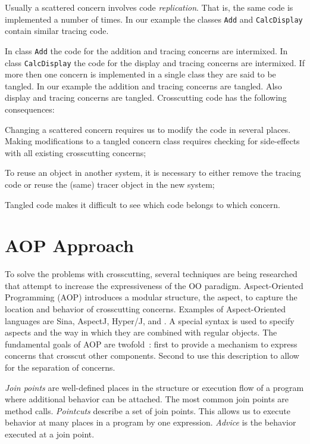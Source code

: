 Usually a scattered concern involves code \emph{replication}.
That is, the same code is implemented a number of times.
In our example the classes \lstinline|Add| and \lstinline|CalcDisplay| contain similar tracing code.

In class \lstinline|Add| the code for the addition and tracing concerns are intermixed.
In class \lstinline|CalcDisplay| the code for the display and tracing concerns are intermixed.
If more then one concern is implemented in a single class they are said to be tangled.
In our example the addition and tracing concerns are tangled.
Also display and tracing concerns are tangled.
Crosscutting code has the following consequences:
\begin{description}[style=nextline,noitemsep]
  \item[Code is difficult to change] Changing a scattered concern requires us to modify the code in several places.
Making modifications to a tangled concern class requires checking for side-effects with all existing crosscutting concerns;
  \item[Code is harder to reuse] To reuse an object in another system, it is necessary to either remove the tracing code or reuse the (same) tracer object in the new system;
  \item[Code is harder to understand] Tangled code makes it difficult to see which code belongs to which concern.
\end{description}

\section{AOP Approach}

To solve the problems with crosscutting, several techniques are being researched that attempt to increase the expressiveness of the OO paradigm.
Aspect-Oriented Programming (AOP) introduces a modular structure, the aspect, to capture the location and behavior of crosscutting concerns.
Examples of Aspect-Oriented languages are Sina, AspectJ, Hyper/J, and \Compose*.
A special syntax is used to specify aspects and the way in which they are combined with regular objects.
The fundamental goals of AOP are twofold~\cite{gradecki:maj03}: first to provide a mechanism to express concerns that crosscut other components.
Second to use this description to allow for the separation of concerns.

\emph{Join points} are well-defined places in the structure or execution flow of a program where additional behavior can be attached.
The most common join points are method calls.
\emph{Pointcuts} describe a set of join points.
This allows us to execute behavior at many places in a program by one expression.
\emph{Advice} is the behavior executed at a join point.

